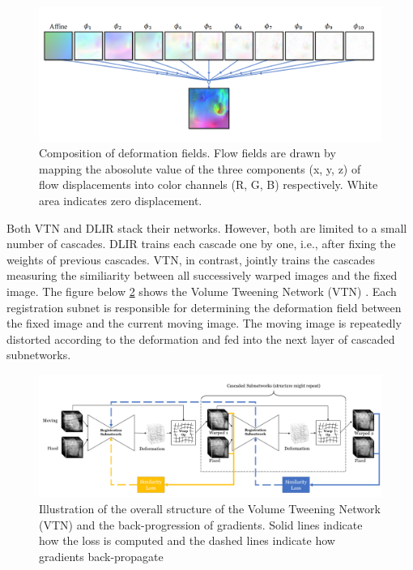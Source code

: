 \documentclass{report}
\begin{document}
	\begin{figure}[H]
		\centering
		\includegraphics[width=\columnwidth]{resources/chapter2/recursive_cascade_flowfield.png}
		\caption{Composition of deformation fields. Flow fields are drawn by mapping the abosolute value of the three components (x, y, z) of flow displacements into color channels (R, G, B) respectively. White area indicates zero displacement. \cite{Zhao_2019}}
		\label{fig:recursive_cascade_flowfield}
	\end{figure}
	
	Both VTN \cite{8889674} and DLIR \cite{de_Vos_2019} stack their networks. However, both are limited to a small number of cascades. DLIR trains each cascade one by one, i.e., after fixing the weights of previous cascades. VTN, in contrast, jointly trains the cascades measuring the similiarity between all successively warped images and the fixed image. The figure below \ref{fig:vtn} shows the Volume Tweening Network (VTN) \cite{8889674}. Each registration subnet is responsible for determining the deformation field between the fixed image and the current moving image. The moving image is repeatedly distorted according to the deformation and fed into the next layer of cascaded subnetworks.
	
	\begin{figure}[H]
		\centering
		\includegraphics[width=\columnwidth]{resources/chapter2/vtn.png}
		\caption{Illustration of the overall structure of the Volume Tweening Network (VTN) and the back-progression of gradients. Solid lines indicate how the loss is computed and the dashed lines indicate how gradients back-propagate\cite{8889674}}
		\label{fig:vtn}
	\end{figure}
	
\end{document}

